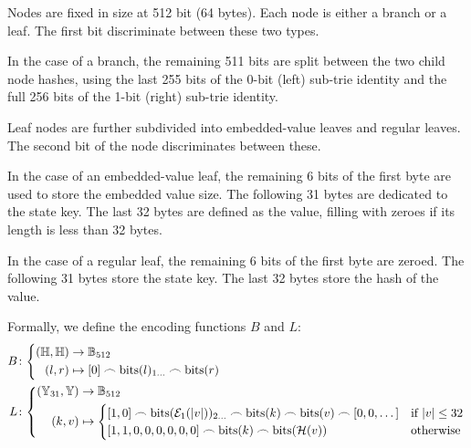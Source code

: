 Nodes are fixed in size at 512 bit (64 bytes). Each node is either a branch or a leaf. The first bit discriminate between these two types.

In the case of a branch, the remaining 511 bits are split between the two child node hashes, using the last 255 bits of the 0-bit (left) sub-trie identity and the full 256 bits of the 1-bit (right) sub-trie identity.

Leaf nodes are further subdivided into embedded-value leaves and regular leaves. The second bit of the node discriminates between these.

In the case of an embedded-value leaf, the remaining 6 bits of the first byte are used to store the embedded value size. The following 31 bytes are dedicated to the state key. The last 32 bytes are defined as the value, filling with zeroes if its length is less than 32 bytes.

In the case of a regular leaf, the remaining 6 bits of the first byte are zeroed. The following 31 bytes store the state key. The last 32 bytes store the hash of the value.

Formally, we define the encoding functions $B$ and $L$:
\begin{align}
  B&\colon\left\{\begin{aligned}
    (\H, \H) &\to \mathbb{B}_{512}\\
    (l, r) &\mapsto [0] \frown \text{bits}(l)_{1\dots} \frown \text{bits}(r)
  \end{aligned}\right.\\
  L&\colon\left\{\begin{aligned}
    (\Y_{31}, \Y) &\to \mathbb{B}_{512}\\
    (k, v) &\mapsto \begin{cases}
      [1, 0] \frown \text{bits}(\se_1(|v|))_{2\dots} \frown \text{bits}(k) \frown \text{bits}(v) \frown [0, 0, \dots] &\when |v| \le 32\\
      [1, 1, 0, 0, 0, 0, 0, 0] \frown \text{bits}(k) \frown \text{bits}(\hash(v)) &\otherwise
    \end{cases}
  \end{aligned}\right.
\end{align}

